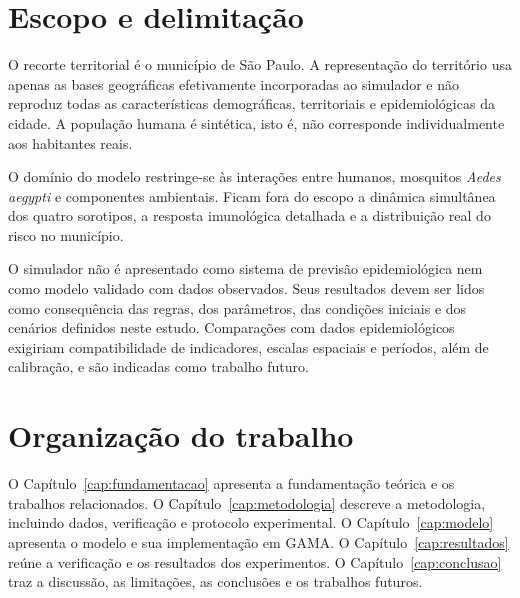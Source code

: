 \section{Escopo e delimitação}
\label{sec:escopo}

O recorte territorial é o município de São Paulo. A representação do território usa apenas as bases geográficas efetivamente incorporadas ao simulador e não reproduz todas as características demográficas, territoriais e epidemiológicas da cidade. A população humana é sintética, isto é, não corresponde individualmente aos habitantes reais.

O domínio do modelo restringe-se às interações entre humanos, mosquitos \textit{Aedes aegypti} e componentes ambientais. Ficam fora do escopo a dinâmica simultânea dos quatro sorotipos, a resposta imunológica detalhada e a distribuição real do risco no município.

O simulador não é apresentado como sistema de previsão epidemiológica nem como modelo validado com dados observados. Seus resultados devem ser lidos como consequência das regras, dos parâmetros, das condições iniciais e dos cenários definidos neste estudo. Comparações com dados epidemiológicos exigiriam compatibilidade de indicadores, escalas espaciais e períodos, além de calibração, e são indicadas como trabalho futuro.

\section{Organização do trabalho}

O Capítulo~\ref{cap:fundamentacao} apresenta a fundamentação teórica e os trabalhos relacionados. O Capítulo~\ref{cap:metodologia} descreve a metodologia, incluindo dados, verificação e protocolo experimental. O Capítulo~\ref{cap:modelo} apresenta o modelo e sua implementação em GAMA. O Capítulo~\ref{cap:resultados} reúne a verificação e os resultados dos experimentos. O Capítulo~\ref{cap:conclusao} traz a discussão, as limitações, as conclusões e os trabalhos futuros.
